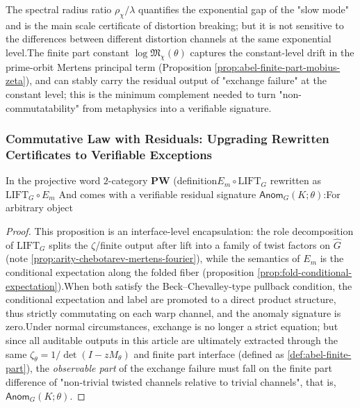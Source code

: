 \begin{remark}\label{rem:pom-anom-why-finite-part}The spectral radius ratio \(\rho_\chi/\lambda\) quantifies the exponential gap of the "slow mode" and is the main scale certificate of distortion breaking; but it is not sensitive to the differences between different distortion channels at the same exponential level.The finite part constant \(\log\mathfrak{M}_\chi(\theta)\) captures the constant-level drift in the prime-orbit Mertens principal term (Proposition \ref{prop:abel-finite-part-mobius-zeta}), and can stably carry the residual output of "exchange failure" at the constant level; this is the minimum complement needed to turn "non-commutatability" from metaphysics into a verifiable signature.\end{remark}

\subsubsection{Commutative Law with Residuals: Upgrading Rewritten Certificates to Verifiable Exceptions}\label{subsec:pom-residual-swap}
\begin{proposition}\label{prop:pom-em-lift-residual-swap}In the projective word $2$-category \(\mathbf{PW}\) (definition\(
E_m\circ \mathrm{LIFT}_G
\)
rewritten as\(
\mathrm{LIFT}_G\circ E_m
\)
And comes with a verifiable residual signature \(\mathsf{Anom}_G(K;\theta)\):For arbitrary object\end{proposition}

\begin{proof}
This proposition is an interface-level encapsulation: the role decomposition of \(\mathrm{LIFT}_G\) splits the \(\zeta\)/finite output after lift into a family of twist factors on \(\widehat G\) (note \ref{prop:arity-chebotarev-mertens-fourier}), while the semantics of \(E_m\) is the conditional expectation along the folded fiber (proposition \ref{prop:fold-conditional-expectation}).When both satisfy the Beck--Chevalley-type pullback condition, the conditional expectation and label are promoted to a direct product structure, thus strictly commutating on each warp channel, and the anomaly signature is zero.Under normal circumstances, exchange is no longer a strict equation; but since all auditable outputs in this article are ultimately extracted through the same \(\zeta_\theta=1/\det(I-zM_\theta)\) and finite part interface (defined as \ref{def:abel-finite-part}), the \emph {observable part} of the exchange failure must fall on the finite part difference of "non-trivial twisted channels relative to trivial channels", that is, \(\mathsf{Anom}_G(K;\theta)\).\end{proof}


